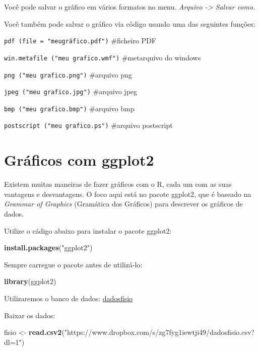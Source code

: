 \documentclass[
]{book}
\newenvironment{Shaded}{\begin{snugshade}}{\end{snugshade}}
\newcommand{\KeywordTok}[1]{\textcolor[rgb]{0.13,0.29,0.53}{\textbf{#1}}}
\newcommand{\NormalTok}[1]{#1}
\newcommand{\StringTok}[1]{\textcolor[rgb]{0.31,0.60,0.02}{#1}}
\begin{document}
Você pode salvar o gráfico em vários formatos no menu.
\emph{Arquivo -\textgreater{} Salvar como}.

Você também pode salvar o gráfico via código usando uma das seguintes funções:

\texttt{pdf\ (file\ =\ "meugráfico.pdf")} \#ficheiro PDF

\texttt{win.metafile\ ("meu\ grafico.wmf")} \#metarquivo do windows

\texttt{png\ ("meu\ grafico.png")} \#arquivo png

\texttt{jpeg\ ("meu\ grafico.jpg")} \#arquivo jpeg

\texttt{bmp\ ("meu\ grafico.bmp")} \#arquivo bmp

\texttt{postscript\ ("meu\ grafico.ps")} \#arquivo postscript

\hypertarget{gruxe1ficos-com-ggplot2}{%
\chapter{Gráficos com ggplot2}\label{gruxe1ficos-com-ggplot2}}

Existem muitas maneiras de fazer gráficos com o R, cada um com as suas vantagens e desvantagens. O foco aqui está no pacote ggplot2, que é baseado na \emph{Grammar of Graphics} (Gramática dos Gráficos) para descrever os gráficos de dados.

Utilize o cádigo abaixo para instalar o pacote ggplot2:

\begin{Shaded}
\begin{Highlighting}[]
\KeywordTok{install.packages}\NormalTok{(}\StringTok{"ggplot2"}\NormalTok{)}
\end{Highlighting}
\end{Shaded}

Sempre carregue o pacote antes de utilizá-lo:

\begin{Shaded}
\begin{Highlighting}[]
\KeywordTok{library}\NormalTok{(ggplot2)}
\end{Highlighting}
\end{Shaded}

Utilizaremos o banco de dados:
\href{https://www.dropbox.com/s/zg7fyg1iewtji49/dadosfisio.csv?dl=1}{dadosfisio}

Baixar os dados:

\begin{Shaded}
\begin{Highlighting}[]
\NormalTok{fisio <-}\StringTok{ }\KeywordTok{read.csv2}\NormalTok{(}\StringTok{"https://www.dropbox.com/s/zg7fyg1iewtji49/dadosfisio.csv?dl=1"}\NormalTok{)}
\end{Highlighting}
\end{Shaded}
\end{document}
